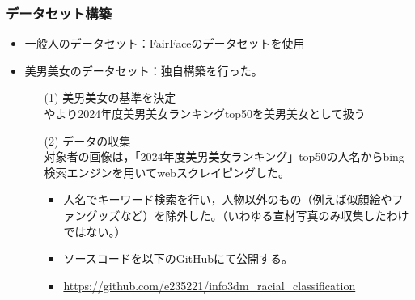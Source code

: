 \documentclass[a4paper,11pt,titlepage]{jsarticle}
\begin{document}
\subsubsection{データセット構築}
\begin{itemize}
    \item 一般人のデータセット：FairFaceのデータセットを使用
    \item 美男美女のデータセット：独自構築を行った。
        \begin{itemize}
            \item[(1)] 美男美女の基準を決定 \\
                \cite{bidanshi}や\cite{bijoshi}より2024年度美男美女ランキングtop50を美男美女として扱う
            \item[(2)] データの収集 \\
                対象者の画像は，「2024年度美男美女ランキング」top50の人名からbing検索エンジンを用いてwebスクレイピングした。
                \begin{itemize}
                	\item	人名でキーワード検索を行い，人物以外のもの（例えば似顔絵やファングッズなど）を除外した。（いわゆる宣材写真のみ収集したわけではない。）
                    \item ソースコードを以下のGitHubにて公開する。
                    \item \url{https://github.com/e235221/info3dm_racial_classification}
                \end{itemize}
        \end{itemize}
\end{itemize}
    
\end{document}
